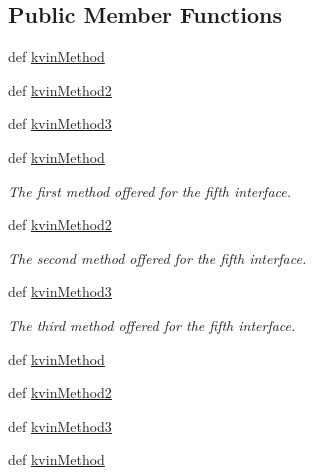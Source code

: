 \subsection*{Public Member Functions}
\begin{DoxyCompactItemize}
\item 
def \hyperlink{classdoxypypy_1_1test_1_1sample__interfaces_1_1_i_kvin_a511c4e7a1d97956cb9ea4b082fd2eddc}{kvin\-Method}
\item 
def \hyperlink{classdoxypypy_1_1test_1_1sample__interfaces_1_1_i_kvin_a1c4979b9222090f88af1755773fa7dd9}{kvin\-Method2}
\item 
def \hyperlink{classdoxypypy_1_1test_1_1sample__interfaces_1_1_i_kvin_a811bcb751a1be11fe645c0c4197bd290}{kvin\-Method3}
\item 
def \hyperlink{classdoxypypy_1_1test_1_1sample__interfaces_1_1_i_kvin_a511c4e7a1d97956cb9ea4b082fd2eddc}{kvin\-Method}
\begin{DoxyCompactList}\small\item\em The first method offered for the fifth interface. \end{DoxyCompactList}\item 
def \hyperlink{classdoxypypy_1_1test_1_1sample__interfaces_1_1_i_kvin_a1c4979b9222090f88af1755773fa7dd9}{kvin\-Method2}
\begin{DoxyCompactList}\small\item\em The second method offered for the fifth interface. \end{DoxyCompactList}\item 
def \hyperlink{classdoxypypy_1_1test_1_1sample__interfaces_1_1_i_kvin_a811bcb751a1be11fe645c0c4197bd290}{kvin\-Method3}
\begin{DoxyCompactList}\small\item\em The third method offered for the fifth interface. \end{DoxyCompactList}\item 
def \hyperlink{classdoxypypy_1_1test_1_1sample__interfaces_1_1_i_kvin_a511c4e7a1d97956cb9ea4b082fd2eddc}{kvin\-Method}
\item 
def \hyperlink{classdoxypypy_1_1test_1_1sample__interfaces_1_1_i_kvin_a1c4979b9222090f88af1755773fa7dd9}{kvin\-Method2}
\item 
def \hyperlink{classdoxypypy_1_1test_1_1sample__interfaces_1_1_i_kvin_a811bcb751a1be11fe645c0c4197bd290}{kvin\-Method3}
\item 
def \hyperlink{classdoxypypy_1_1test_1_1sample__interfaces_1_1_i_kvin_a511c4e7a1d97956cb9ea4b082fd2eddc}{kvin\-Method}

\end{DoxyCompactItemize}
